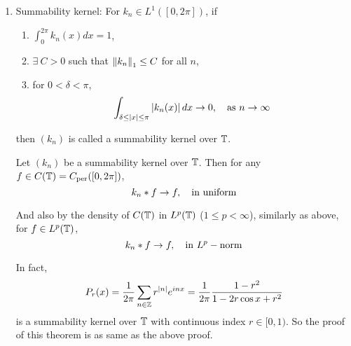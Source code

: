 \begin{enumerate}[label=\arabic*.]
	\item Summability kernel: For $k_n \in L^1([0,2\pi])$, if
	\begin{enumerate}[label=(\roman*)]
		\item $\int_0^{2\pi}k_n(x)dx = 1$,
		\item $\exists~C > 0$ such that $\left\lVert k_n\right\lVert_1 \leq C$ for all $n$,
		\item for $0 < \delta < \pi$,
		\begin{equation*}
			\int_{\delta \leq|x| \leq \pi}\left|k_n(x)\right| d x \rightarrow 0,\quad \text{as }n \rightarrow \infty
		\end{equation*}
	\end{enumerate}
	then $(k_n)$ is called a summability kernel over $\mathbb{T}$.
	\begin{thm}
		Let $(k_n)$ be a summability kernel over $\mathbb{T}$. Then for any $f \in C(\mathbb{T}) = C_{\text{per}}([0,2\pi])$,
		\begin{equation*}
			k_n *f \rightarrow f,\quad \text{in uniform}
		\end{equation*}
	\end{thm}
	\begin{rmk}
		And also by the density of $C(\mathbb{T})$ in $L^p(\mathbb{T})$ ($1\leq p < \infty$), similarly as above, for $f \in L^p(\mathbb{T})$,
		\begin{equation*}
			k_n *f \rightarrow f,\quad \text{in } L^p-\text{norm}
		\end{equation*}
	\end{rmk}
	In fact,
	\begin{equation*}
		P_r(x)  = \frac{1}{2\pi}\sum_{n \in \mathbb{Z}} r^{\left\lvert n\right\lvert}e^{inx} = \frac{1}{2\pi} \frac{1-r^2}{1-2r\cos x +r^2}
	\end{equation*}
	is a summability kernel over $\mathbb{T}$ with continuous index $r \in [0,1)$. So the proof of this theorem is as same as the above proof. 



\end{enumerate}
